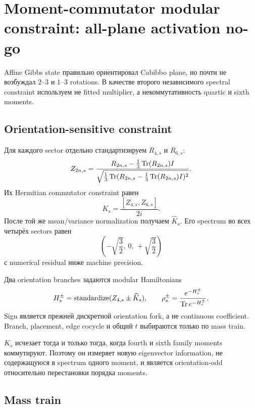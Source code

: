 \chapter{Moment-commutator modular constraint: all-plane activation no-go}

Affine Gibbs state правильно ориентировал Cabibbo plane, но почти не
возбуждал \(2\)--\(3\) и \(1\)--\(3\) rotations. В качестве второго
независимого spectral constraint используем не fitted multiplier, а
некоммутативность quartic и sixth moments.

\section{Orientation-sensitive constraint}

Для каждого sector отдельно стандартизируем \(R_{4,s}\) и \(R_{6,s}\):
\begin{equation}
 Z_{2n,s}=\frac{R_{2n,s}-\frac13\operatorname{Tr}(R_{2n,s})I}
 {\sqrt{\frac13\operatorname{Tr}(R_{2n,s}-\frac13\operatorname{Tr}(R_{2n,s})I)^2}}.
\end{equation}
Их Hermitian commutator constraint равен
\begin{equation}
 K_s=\frac{[Z_{4,s},Z_{6,s}]}{2i}.
\end{equation}
После той же mean/variance normalization получаем \(\widehat K_s\). Его
spectrum во всех четырёх sectors равен
\begin{equation}
 \left(-\sqrt{\frac32},\,0,\,+\sqrt{\frac32}\right)
\end{equation}
с numerical residual ниже machine precision.

Два orientation branches задаются modular Hamiltonians
\begin{equation}
 H_s^\pm=\operatorname{standardize}(Z_{4,s}\pm\widehat K_s),
 \qquad
 \rho_s^\pm=\frac{e^{-H_s^\pm}}{\operatorname{Tr} e^{-H_s^\pm}}.
\end{equation}
Sign является прежней дискретной orientation fork, а не continuous
coefficient. Branch, placement, edge cocycle и общий \(t\) выбираются только
по mass train.

\begin{proposition}
\(K_s\) исчезает тогда и только тогда, когда fourth и sixth family moments
коммутируют. Поэтому он измеряет новую eigenvector information, не
содержащуюся в spectrum одного moment, и является orientation-odd относительно
перестановки порядка moments.
\end{proposition}

\section{Mass train}

